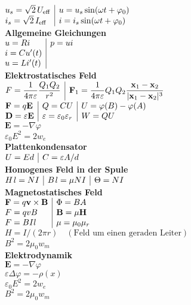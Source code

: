 \documentclass[a4paper,10pt,fleqn,twoside,twocolumn,dvipdfmx]{scrartcl}
\newcommand{\strong}[1]{\textsf{\textbf{#1}}}
\newcommand{\ds}{\displaystyle}
\newcommand{\bvec}[1]{\mathbf{#1}}
\begin{document}
$\begin{array}{@{}l|l}
u_s = \sqrt{2}\,U_\mathrm{eff}
& u = u_s\sin(\omega t+\varphi_0)\\
i_s = \sqrt{2}\,I_\mathrm{eff}
& i = i_s\sin(\omega t+\varphi_0)
\end{array}$\\[4pt]
\strong{Allgemeine Gleichungen}\\
$\begin{array}{@{}l|l}
u = Ri & p=ui\\
i = Cu'(t)\\
u = Li'(t)
\end{array}$\\[4pt]
\strong{Elektrostatisches Feld}\\[2pt]
$\begin{array}{@{}l|l}
\ds F=\frac{1}{4\pi\varepsilon}\frac{Q_1Q_2}{r^2}
&\ds\bvec F_1 = \frac{1}{4\pi\varepsilon}
Q_1Q_2\frac{\bvec x_1-\bvec x_2}
{|\bvec x_1-\bvec x_2|^3}
\end{array}$\\
$\begin{array}{@{}l|l|l}
\bvec F = q\bvec E & Q=CU
&U = \varphi(B)-\varphi(A)\\
\bvec D = \varepsilon \bvec E
&\varepsilon = \varepsilon_0\varepsilon_r
& W=QU
\end{array}$\\
$\bvec E = -\nabla\varphi$\\
$\varepsilon_0 E^2 = 2w_e$\\[4pt]
\strong{Plattenkondensator}\\
$\begin{array}{@{}l|l}
U=Ed & C=\varepsilon A/d
\end{array}$\\[4pt]
\strong{Homogenes Feld in der Spule}\\
$\begin{array}{@{}l|l|l}
H\;\!l = NI & B\;\!l = \mu NI & \Theta = NI
\end{array}$\\[4pt]
\strong{Magnetostatisches Feld}\\
$\begin{array}{@{}l|l}
\bvec F = q\bvec v\times\bvec B
& \Phi = BA\\
F = qvB & \bvec B = \mu\bvec H\\
F = BIl & \mu = \mu_0\mu_r
\end{array}$\\
$H = I/(2\pi r)\quad (\text{Feld um einen geraden Leiter})$\\
$B^2 = 2\mu_0 w_m$\\[4pt]
\strong{Elektrodynamik}\\[2pt]
$\bvec E = -\nabla\varphi$\\
$\varepsilon\Delta\varphi = -\rho(x)$\\
$\varepsilon_0 E^2 = 2w_e$\\
$B^2 = 2\mu_0 w_m$
\end{document}

